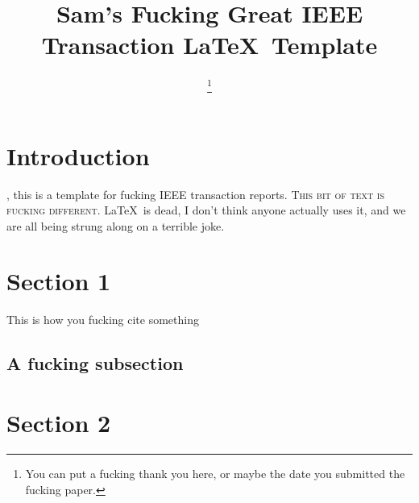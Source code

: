 \documentclass[journal,transmag]{IEEEtran}
\begin{document}
\title{Sam's Fucking Great IEEE Transaction \LaTeX\ Template}

\author{

\thanks{You can put a fucking thank you here, or maybe the date you submitted the fucking paper.}}




\maketitle

\IEEEdisplaynontitleabstractindextext

\IEEEpeerreviewmaketitle

\section{Introduction}
 
, this is a template for fucking IEEE transaction reports. \textsc{This bit of text is fucking different.} \LaTeX\ is dead, I don't think anyone actually uses it, and we are all being strung along on a terrible joke.

\section{Section 1}
	\lipsum[1-2]
	This is how you fucking cite something \cite{mrx05}
	
	\subsection{A fucking subsection}
		
	
\section{Section 2}
	\lipsum[3-5]
\end{document}
